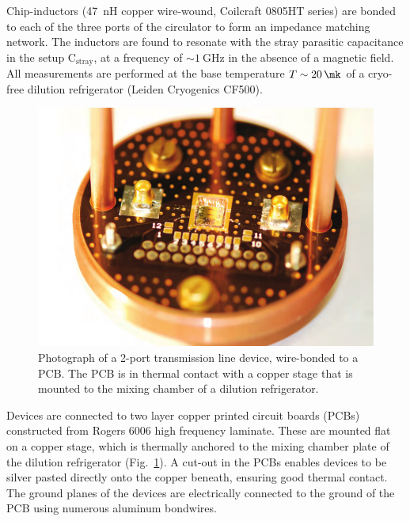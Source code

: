 Chip-inductors (\SI{47}{\nano\henry} copper wire-wound, Coilcraft 0805HT series) are bonded to each of the three ports of the circulator to form an impedance matching network. The inductors are found to resonate with the stray parasitic capacitance in the setup C$_{\mathrm{stray}}$, at a frequency of $\sim \SI{1}{\giga\hertz}$ in the absence of a magnetic field. All measurements are performed at the base temperature  $T \sim \SI{20}{\mk}$ of a cryo-free dilution refrigerator (Leiden Cryogenics CF500).

\begin{figure}
  \includegraphics[scale=0.5]{Sfig1.pdf}
  \caption[2-port quantum Hall transmission Line device]{Photograph of a 2-port transmission line device, wire-bonded to a PCB. The PCB is in thermal contact with a copper stage that is mounted to the mixing chamber of a dilution refrigerator.}
  \label{fig:qhe_s1}
\end{figure}

Devices are connected to two layer copper printed circuit boards (PCBs) constructed from Rogers 6006 high frequency laminate. These are mounted flat on a copper stage, which is thermally anchored to the mixing chamber plate of the dilution refrigerator (Fig.~\ref{fig:qhe_s1}). A cut-out in the PCBs enables devices to be silver pasted directly onto the copper beneath, ensuring good thermal contact. The ground planes of the devices are electrically connected to the ground of the PCB using numerous aluminum bondwires.

